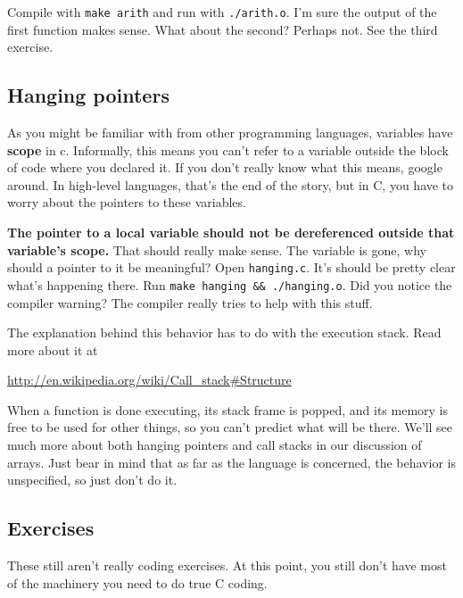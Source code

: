\documentclass[ebook,11pt,oneside,openany]{memoir}
\begin{document}
Compile with \texttt{make arith} and run with \texttt{./arith.o}. I'm sure the output of the first function makes sense. What about the second? Perhaps not. See the third exercise.

\subsection{Hanging pointers}

As you might be familiar with from other programming languages, variables have \textbf{scope} in c. Informally, this means you can't refer to a variable outside the block of code where you declared it. If you don't really know what this means, google around. In high-level languages, that's the end of the story, but in C, you have to worry about the pointers to these variables.

\textbf{The pointer to a local variable should not be dereferenced outside that variable's scope.} That should really make sense. The variable is gone, why should a pointer to it be meaningful? Open \texttt{hanging.c}. It's should be pretty clear what's happening there. Run \texttt{make hanging \&\& ./hanging.o}. Did you notice the compiler warning? The compiler really tries to help with this stuff. 

The explanation behind this behavior has to do with the execution stack. Read more about it at

\url{http://en.wikipedia.org/wiki/Call_stack#Structure}

When a function is done executing, its stack frame is popped, and its memory is free to be used for other things, so you can't predict what will be there. We'll see much more about both hanging pointers and call stacks in our discussion of arrays. Just bear in mind that as far as the language is concerned, the behavior is unspecified, so just don't do it.

\subsection{Exercises}

These still aren't really coding exercises. At this point, you still don't have most of the machinery you need to do true C coding.
\end{document}
